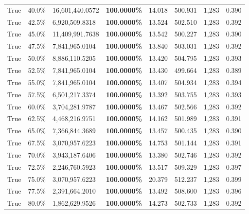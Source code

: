 \begin{table}[H]
\begin{tabular}{lllrllll}
\cline{1-8}
True & 40.0\% & 16,601,440.0572 & \bfseries \color{red} 100.0000\% & 14.018 & 500.931 & 1,283 & 0.390 \\
\cline{1-8}
True & 42.5\% & 6,920,509.8318 & \bfseries \color{red} 100.0000\% & 13.524 & 502.510 & 1,283 & 0.392 \\
\cline{1-8}
True & 45.0\% & 11,409,991.7638 & \bfseries \color{red} 100.0000\% & 13.542 & 500.227 & 1,283 & 0.390 \\
\cline{1-8}
True & 47.5\% & 7,841,965.0104 & \bfseries \color{red} 100.0000\% & 13.840 & 503.031 & 1,283 & 0.392 \\
\cline{1-8}
True & 50.0\% & 8,886,110.5205 & \bfseries \color{red} 100.0000\% & 13.420 & 504.795 & 1,283 & 0.393 \\
\cline{1-8}
True & 52.5\% & 7,841,965.0104 & \bfseries \color{red} 100.0000\% & 13.430 & 499.664 & 1,283 & 0.389 \\
\cline{1-8}
True & 55.0\% & 7,841,965.0104 & \bfseries \color{red} 100.0000\% & 13.407 & 504.934 & 1,283 & 0.394 \\
\cline{1-8}
True & 57.5\% & 6,501,217.3374 & \bfseries \color{red} 100.0000\% & 13.392 & 503.755 & 1,283 & 0.393 \\
\cline{1-8}
True & 60.0\% & 3,704,281.9787 & \bfseries \color{red} 100.0000\% & 13.467 & 502.566 & 1,283 & 0.392 \\
\cline{1-8}
True & 62.5\% & 4,468,216.9751 & \bfseries \color{red} 100.0000\% & 14.162 & 501.989 & 1,283 & 0.391 \\
\cline{1-8}
True & 65.0\% & 7,366,844.3689 & \bfseries \color{red} 100.0000\% & 13.457 & 500.435 & 1,283 & 0.390 \\
\cline{1-8}
True & 67.5\% & 3,070,957.6223 & \bfseries \color{red} 100.0000\% & 14.753 & 501.144 & 1,283 & 0.391 \\
\cline{1-8}
True & 70.0\% & 3,943,187.6406 & \bfseries \color{red} 100.0000\% & 13.380 & 502.746 & 1,283 & 0.392 \\
\cline{1-8}
True & 72.5\% & 2,246,760.5923 & \bfseries \color{red} 100.0000\% & 13.517 & 509.329 & 1,283 & 0.397 \\
\cline{1-8}
True & 75.0\% & 3,070,957.6223 & \bfseries \color{red} 100.0000\% & 20.379 & 512.237 & 1,283 & 0.399 \\
\cline{1-8}
True & 77.5\% & 2,391,664.2010 & \bfseries \color{red} 100.0000\% & 13.492 & 508.600 & 1,283 & 0.396 \\
\cline{1-8}
True & 80.0\% & 1,862,629.9526 & \bfseries \color{red} 100.0000\% & 14.273 & 502.733 & 1,283 & 0.392 \\

\end{tabular}
\end{table}
